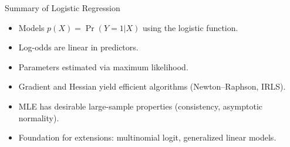 \documentclass[../../main.tex]{subfiles}
\begin{document}
\begin{frame}{Summary of Logistic Regression}
\begin{itemize}
    \item Models $p(X) = \Pr(Y=1|X)$ using the logistic function.  
    \item Log-odds are linear in predictors.  
    \item Parameters estimated via maximum likelihood.  
    \item Gradient and Hessian yield efficient algorithms (Newton–Raphson, IRLS).  
    \item MLE has desirable large-sample properties (consistency, asymptotic normality).  
    \item Foundation for extensions: multinomial logit, generalized linear models.  
\end{itemize}
\end{frame}
\end{document}
